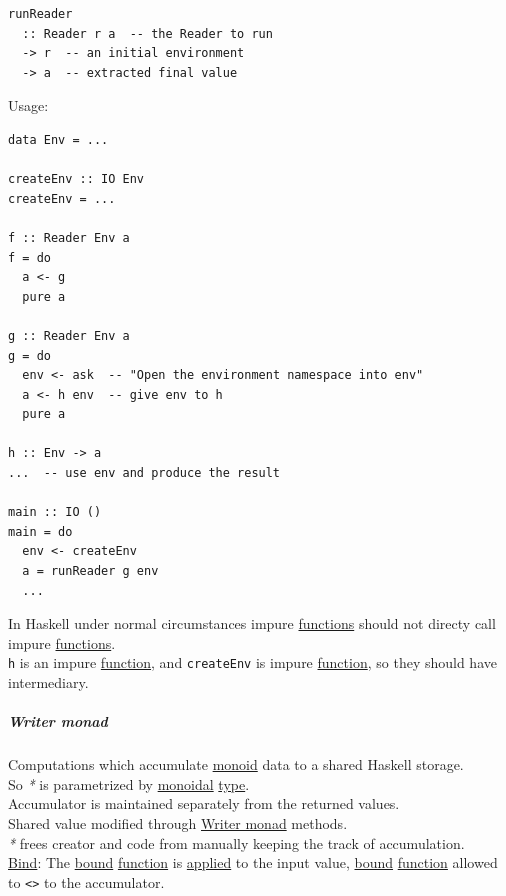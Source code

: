 \documentclass[a4paper,14pt,oneside]{book}
\begin{document}
\begin{verbatim}
runReader
  :: Reader r a  -- the Reader to run
  -> r  -- an initial environment
  -> a  -- extracted final value
\end{verbatim}

Usage:\\
\begin{verbatim}
data Env = ...

createEnv :: IO Env
createEnv = ...

f :: Reader Env a
f = do
  a <- g
  pure a

g :: Reader Env a
g = do
  env <- ask  -- "Open the environment namespace into env"
  a <- h env  -- give env to h
  pure a

h :: Env -> a
...  -- use env and produce the result

main :: IO ()
main = do
  env <- createEnv
  a = runReader g env
  ...
\end{verbatim}

In Haskell under normal circumstances impure \hyperref[org0da3116]{functions} should not directy call impure \hyperref[org0da3116]{functions}.\\
\texttt{h} is an impure \hyperref[org25ee224]{function}, and \texttt{createEnv} is impure \hyperref[org25ee224]{function}, so they should have intermediary.\\

\subparagraph{\label{orgdb685e2}Writer monad}
\label{sec:orge4ac042}
Computations which accumulate \hyperref[orgb6f1b3a]{monoid} data to a shared Haskell storage.\\
So \emph{*} is parametrized by \hyperref[org076d777]{monoidal} \hyperref[org33d7e2e]{type}.\\

Accumulator is maintained separately from the returned values.\\

Shared value modified through \hyperref[orgdb685e2]{Writer monad} methods.\\

\emph{*} frees creator and code from manually keeping the track of accumulation.\\

\hyperref[org624c8a5]{Bind}: The \hyperref[org616bef9]{bound} \hyperref[org25ee224]{function} is \hyperref[org277c4f3]{applied} to the input value, \hyperref[org616bef9]{bound} \hyperref[org25ee224]{function} allowed to \texttt{<>} to the accumulator.\\
\end{document}
